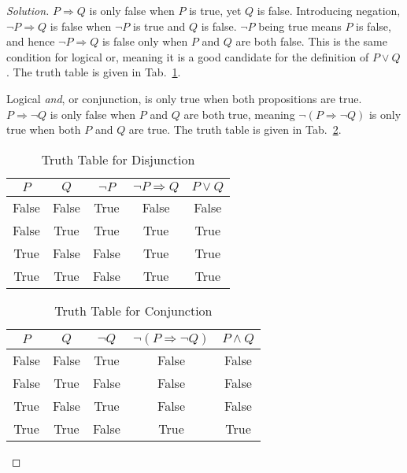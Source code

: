 \documentclass{article}
\theoremstyle{normal}
\begin{document}
    \begin{proof}[Solution]
        $P\Rightarrow{Q}$ is only false when $P$ is true, yet $Q$ is false.
        Introducing negation, $\neg{P}\Rightarrow{Q}$ is false when
        $\neg{P}$ is true and $Q$ is false. $\neg{P}$ being true means $P$ is
        false, and hence $\neg{P}\Rightarrow{Q}$ is false only when $P$ and $Q$
        are both false. This is the same condition for logical or, meaning it is
        a good candidate for the definition of $P\lor{Q}$. The truth table is
        given in Tab.~\ref{tab:truth_tab_disjunction}.
        \par\hfill\par
        Logical \textit{and}, or conjunction, is only true when both
        propositions are true. $P\Rightarrow\neg{Q}$ is only false when $P$
        and $Q$ are both true, meaning $\neg(P\Rightarrow\neg{Q})$ is only
        true when both $P$ and $Q$ are true. The truth table is given in
        Tab.~\ref{tab:truth_tab_conjunction}.
        \par\hfill\par
        \begin{table}
            \centering
            \begin{tabular}{c | c | c | c | c}
                $P$&$Q$&$\neg{P}$&$\neg{P}\Rightarrow{Q}$&$P\lor{Q}$\\
                \hline
                False&False&True&False&False\\
                False&True&True&True&True\\
                True&False&False&True&True\\
                True&True&False&True&True
            \end{tabular}
            \caption{Truth Table for Disjunction}
            \label{tab:truth_tab_disjunction}
        \end{table}
        \begin{table}
            \centering
            \begin{tabular}{c | c | c | c | c}
                $P$&$Q$&$\neg{Q}$&$\neg(P\Rightarrow\neg{Q})$&$P\land{Q}$\\
                \hline
                False&False&True&False&False\\
                False&True&False&False&False\\
                True&False&True&False&False\\
                True&True&False&True&True
            \end{tabular}
            \caption{Truth Table for Conjunction}
            \label{tab:truth_tab_conjunction}
        \end{table}
    \end{proof}
\end{document}
